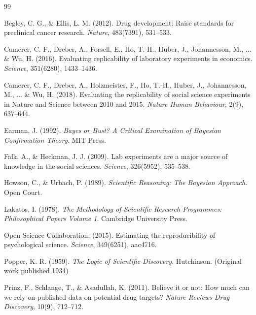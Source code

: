 \documentclass[11pt,a4paper]{article}
\begin{document}
\begin{thebibliography}{99}

Begley, C. G., \& Ellis, L. M. (2012).
Drug development: Raise standards for preclinical cancer research.
\textit{Nature}, 483(7391), 531--533.

Camerer, C. F., Dreber, A., Forsell, E., Ho, T.-H., Huber, J., Johannesson, M., ... \& Wu, H. (2016).
Evaluating replicability of laboratory experiments in economics.
\textit{Science}, 351(6280), 1433--1436.

Camerer, C. F., Dreber, A., Holzmeister, F., Ho, T.-H., Huber, J., Johannesson, M., ... \& Wu, H. (2018).
Evaluating the replicability of social science experiments in Nature and Science between 2010 and 2015.
\textit{Nature Human Behaviour}, 2(9), 637--644.

Earman, J. (1992).
\textit{Bayes or Bust? A Critical Examination of Bayesian Confirmation Theory}.
MIT Press.

Falk, A., \& Heckman, J. J. (2009).
Lab experiments are a major source of knowledge in the social sciences.
\textit{Science}, 326(5952), 535--538.

Howson, C., \& Urbach, P. (1989).
\textit{Scientific Reasoning: The Bayesian Approach}.
Open Court.

Lakatos, I. (1978).
\textit{The Methodology of Scientific Research Programmes: Philosophical Papers Volume 1}.
Cambridge University Press.

Open Science Collaboration. (2015).
Estimating the reproducibility of psychological science.
\textit{Science}, 349(6251), aac4716.

Popper, K. R. (1959).
\textit{The Logic of Scientific Discovery}.
Hutchinson. (Original work published 1934)

Prinz, F., Schlange, T., \& Asadullah, K. (2011).
Believe it or not: How much can we rely on published data on potential drug targets?
\textit{Nature Reviews Drug Discovery}, 10(9), 712--712.

\end{thebibliography}
\end{document}
